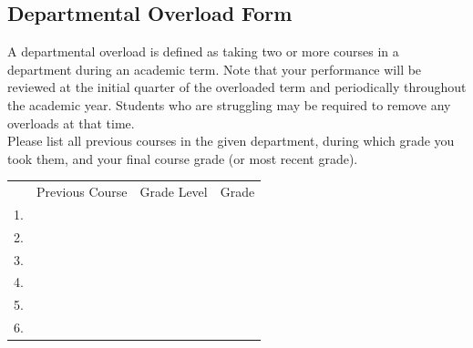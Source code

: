 \newpage

\subsection{Departmental Overload Form}

A departmental overload is defined as taking two or more courses in a department during an academic term.  Note that your performance will be reviewed at the initial quarter of the overloaded term and periodically throughout the academic year.  Students who are struggling may be required to remove any overloads at that time.  \\

Please list all previous courses in the given department, during which grade you took them, and your final course grade (or most recent grade).








\renewcommand{\arraystretch}{2}
\begin{tabular}{lccc}
  & \hspace{2cm} Previous Course  \hspace{2cm} & Grade Level & Grade \\
  1.& \underline{\hspace{7cm}} &\underline{\hspace{1cm}} &\underline{\hspace{1cm}} \\
  2.& \underline{\hspace{7cm}} &\underline{\hspace{1cm}} &\underline{\hspace{1cm}} \\
  3.& \underline{\hspace{7cm}} &\underline{\hspace{1cm}} &\underline{\hspace{1cm}} \\
  4.& \underline{\hspace{7cm}} &\underline{\hspace{1cm}} &\underline{\hspace{1cm}} \\
  5.& \underline{\hspace{7cm}} &\underline{\hspace{1cm}} &\underline{\hspace{1cm}} \\
  6.& \underline{\hspace{7cm}} &\underline{\hspace{1cm}} &\underline{\hspace{1cm}} 
\end{tabular}

